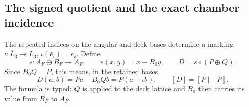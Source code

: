 \subsection{The signed quotient and the exact chamber incidence}
\label{rnmt:subsec:signed-quotient}

The repeated indices on the angular and deck bases determine a marking
\(\iota:\overline L_3\to L_3\), \(\iota(\bar e_i)=e_i\).  Define
\begin{equation}
 s:A_F\oplus B_F\longrightarrow A_F,\qquad
 s(x,y)=x-B_0y,
 \qquad
 D=s\circ(P\oplus Q).
 \label{rnmt:eq:D-factorization}
\end{equation}
Since \(B_0Q=P\), this means, in the retained bases,
\begin{equation}
 D(a,b)=Pa-B_0Qb=P(a-\iota b),\qquad [D]=[P\mid-P].
 \label{rnmt:eq:D-formula}
\end{equation}
The formula is typed: \(Q\) is applied to the deck lattice and \(B_0\)
then carries its value from \(B_F\) to \(A_F\).

